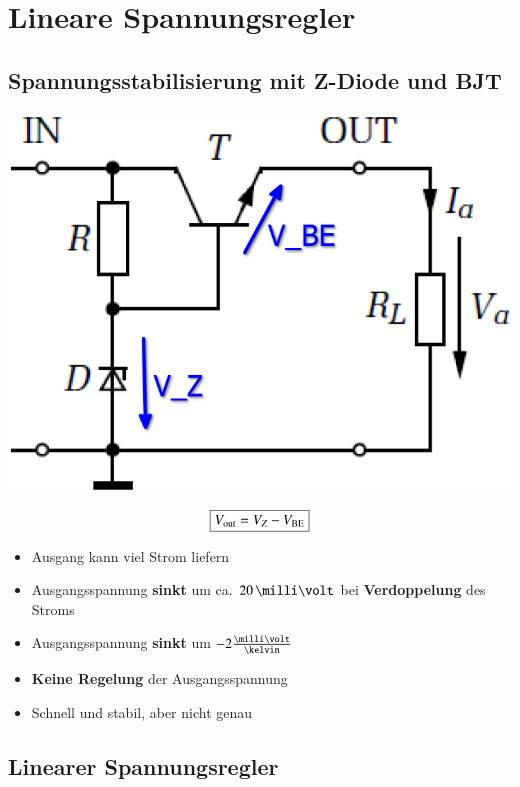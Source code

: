 \section{Lineare Spannungsregler}

\subsection{Spannungsstabilisierung mit Z-Diode und BJT}

\begin{minipage}[c]{0.25\columnwidth}
    \includegraphics[width=\columnwidth]{images/spannungsstabilisierung_z-diode_bjt.png}
\end{minipage}
\hfill
\begin{minipage}[c]{0.72\columnwidth}
    $$ \boxed{ V_{\rm out} = V_Z - V_{\rm BE}} $$
    \begin{itemize}
        \item Ausgang kann viel Strom liefern
        \item Ausgangsspannung \textbf{sinkt} um ca. $20 \, \milli \volt$ bei \textbf{Verdoppelung} des Stroms
        \item Ausgangsspannung \textbf{sinkt} um $- 2 \frac{\milli \volt}{\kelvin}$
        \item \textbf{Keine Regelung} der Ausgangsspannung
        \item Schnell und stabil, aber nicht genau 
    \end{itemize}
\end{minipage}


\subsection{Linearer Spannungsregler}

